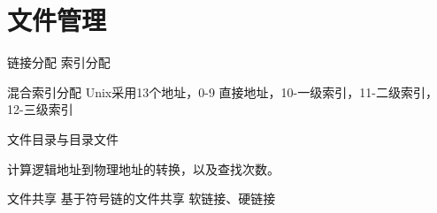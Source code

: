 \chapter{文件管理}

链接分配
索引分配

混合索引分配
Unix采用13个地址，0-9 直接地址，10-一级索引，11-二级索引，12-三级索引 

文件目录与目录文件

计算逻辑地址到物理地址的转换，以及查找次数。

文件共享
基于符号链的文件共享
软链接、硬链接
